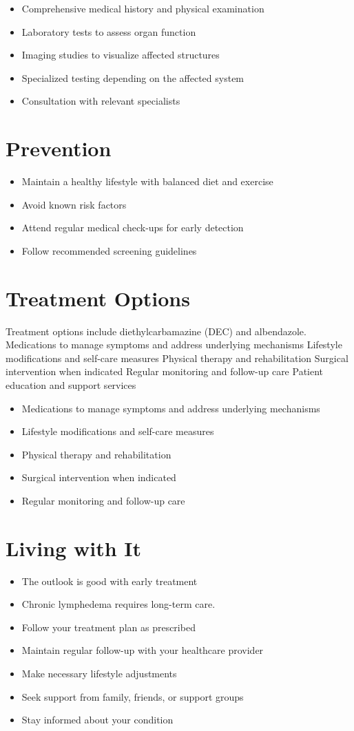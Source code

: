\begin{itemize}[noitemsep]
  \item Comprehensive medical history and physical examination
  \item Laboratory tests to assess organ function
  \item Imaging studies to visualize affected structures
  \item Specialized testing depending on the affected system
  \item Consultation with relevant specialists
\end{itemize}
\section{Prevention}
\begin{itemize}[noitemsep]
  \item Maintain a healthy lifestyle with balanced diet and exercise
  \item Avoid known risk factors
  \item Attend regular medical check-ups for early detection
  \item Follow recommended screening guidelines
\end{itemize}
\section{Treatment Options}
Treatment options include diethylcarbamazine (DEC) and albendazole. Medications to manage symptoms and address underlying mechanisms Lifestyle modifications and self-care measures Physical therapy and rehabilitation Surgical intervention when indicated Regular monitoring and follow-up care Patient education and support services

\begin{itemize}[noitemsep]
  \item Medications to manage symptoms and address underlying mechanisms
  \item Lifestyle modifications and self-care measures
  \item Physical therapy and rehabilitation
  \item Surgical intervention when indicated
  \item Regular monitoring and follow-up care
\end{itemize}
\section{Living with It}
\begin{itemize}[noitemsep]
  \item The outlook is good with early treatment
  \item Chronic lymphedema requires long-term care.
  \item Follow your treatment plan as prescribed
  \item Maintain regular follow-up with your healthcare provider
  \item Make necessary lifestyle adjustments
  \item Seek support from family, friends, or support groups
  \item Stay informed about your condition
\end{itemize}
